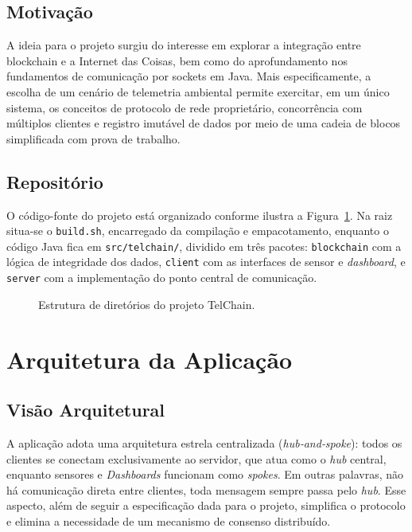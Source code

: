 \documentclass[12pt, a4paper]{article}
\begin{document}
\subsection{Motivação}
A ideia para o projeto surgiu do interesse em explorar a integração entre blockchain e a Internet das Coisas,
bem como do aprofundamento nos fundamentos de comunicação por sockets em Java. Mais especificamente, a escolha de um cenário de
telemetria ambiental permite exercitar, em um único sistema, os conceitos de protocolo de rede proprietário,
concorrência com múltiplos clientes e registro imutável de dados por meio de uma cadeia de blocos
simplificada com prova de trabalho.

\subsection{Repositório}

O código-fonte do projeto está organizado conforme ilustra a Figura~\ref{fig:dirtree}. 
Na raiz situa-se o \texttt{build.sh}, encarregado da compilação e empacotamento, 
enquanto o código Java fica em \texttt{src/telchain/}, dividido em três pacotes: 
\texttt{blockchain} com a lógica de integridade dos dados, 
\texttt{client} com as interfaces de sensor e \emph{dashboard}, e 
\texttt{server} com a implementação do ponto central de comunicação.


\begin{figure}[H]
\centering
\begin{tcolorbox}[colback=code-bg, colframe=black, boxrule=0.4pt, width=0.7\textwidth, arc=0mm]
\end{tcolorbox}
\caption{Estrutura de diretórios do projeto TelChain.}
\label{fig:dirtree}
\end{figure}

\section{Arquitetura da Aplicação}

\subsection{Visão Arquitetural}

A aplicação adota uma arquitetura estrela centralizada (\emph{hub‑and‑spoke}): todos
os clientes se conectam exclusivamente ao servidor, que atua como o \emph{hub}
central, enquanto sensores e \emph{Dashboards} funcionam como \emph{spokes}. Em 
outras palavras, não há comunicação direta entre clientes, toda mensagem sempre 
passa pelo \emph{hub}. Esse aspecto, além de seguir a especificação dada para o 
projeto, simplifica o protocolo e elimina a necessidade de um mecanismo de consenso 
distribuído.
\end{document}
